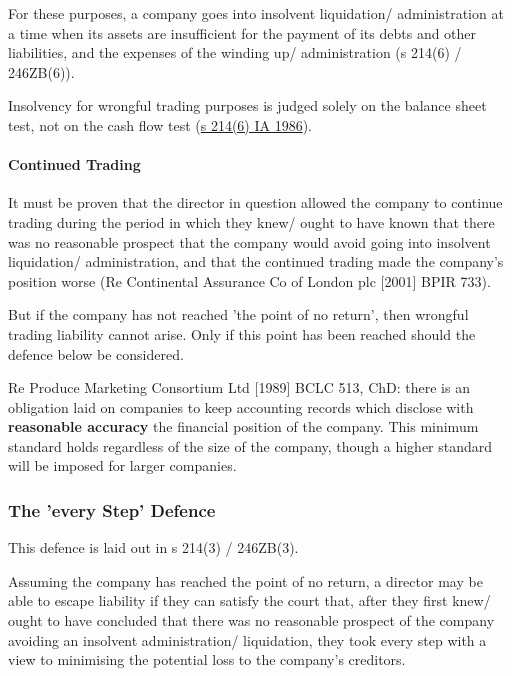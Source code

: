 \documentclass[
]{article}
\begin{document}
For these purposes, a company goes into insolvent liquidation/
administration at a time when its assets are insufficient for the
payment of its debts and other liabilities, and the expenses of the
winding up/ administration (s 214(6) / 246ZB(6)).

Insolvency for wrongful trading purposes is judged solely on the balance
sheet test, not on the cash flow test
(\href{https://www.legislation.gov.uk/ukpga/1986/45/section/214}{s
214(6) IA 1986}).

\hypertarget{continued-trading}{%
\paragraph{Continued Trading}\label{continued-trading}}

It must be proven that the director in question allowed the company to
continue trading during the period in which they knew/ ought to have
known that there was no reasonable prospect that the company would avoid
going into insolvent liquidation/ administration, and that the continued
trading made the company's position worse (Re Continental Assurance Co
of London plc {[}2001{]} BPIR 733).

But if the company has not reached 'the point of no return', then
wrongful trading liability cannot arise. Only if this point has been
reached should the defence below be considered.

Re Produce Marketing Consortium Ltd {[}1989{]} BCLC 513, ChD: there is
an obligation laid on companies to keep accounting records which
disclose with \textbf{reasonable accuracy} the financial position of the
company. This minimum standard holds regardless of the size of the
company, though a higher standard will be imposed for larger companies.

\hypertarget{the-every-step-defence}{%
\subsubsection{The 'every Step' Defence}\label{the-every-step-defence}}

This defence is laid out in s 214(3) / 246ZB(3).

Assuming the company has reached the point of no return, a director may
be able to escape liability if they can satisfy the court that, after
they first knew/ ought to have concluded that there was no reasonable
prospect of the company avoiding an insolvent administration/
liquidation, they took every step with a view to minimising the
potential loss to the company's creditors.
\end{document}
